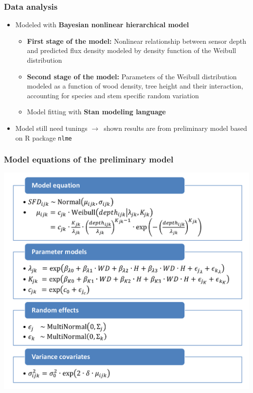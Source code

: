 \documentclass[usepdftitle=false]{beamer}
\newcommand{\Blue}[1]{{\color{blue!50!black}\textbf{#1}}}
\newcommand{\rar}{$\rightarrow$}
\begin{document}
\begin{frame}
	\frametitle{Data analysis}
	\begin{itemize}
		\item Modeled with \Blue{Bayesian nonlinear hierarchical model}
		\begin{itemize}			
			\item<2-> \alert<2>{\textbf{First stage of the model:}} Nonlinear relationship between sensor depth and predicted flux density modeled by density function of the Weibull distribution
			\item<3->  \alert<3>{\textbf{Second stage of the model:}} Parameters of the Weibull distribution modeled as a function of wood density, tree height and their interaction, accounting for species and stem specific random variation
			\item<4->  \alert<4>{Model fitting with\textbf{ Stan modeling language}}
		\end{itemize}
		\item<visible@5| alert@5> Model still need tunings \rar\ shown results are from preliminary model based on R package \texttt{nlme}
	\end{itemize}
\end{frame}

\begin{frame}
	\frametitle{Model equations of the preliminary model}
  \includegraphics[height=0.9\textheight]{figures/HFD_06_model.png}
\end{frame}
\end{document}
